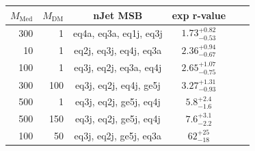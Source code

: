 \begin{table}
  \centering
  \begin{tabular}{rrcccc}
    \hline\hline
    $M_{\text{Med}}$ & $M_{\text{DM}}$ & nJet MSB & exp r-value\\
    \hline
      300 &   1 & eq4a, eq3a, eq1j, eq3j & $1.73_{-0.53}^{+0.82}$     \\ %
       10 &   1 & eq2j, eq3j, eq4j, eq3a & $2.36_{-0.67}^{+0.94}$     \\ %
      100 &   1 & eq3j, eq2j, eq3a, eq4j & $2.65_{-0.75}^{+1.07}$     \\ %
      300 & 100 & eq3j, eq2j, eq4j, ge5j & $3.27_{-0.93}^{+1.31}$     \\ %
      500 &   1 & eq3j, eq2j, ge5j, eq4j & $5.8_{-1.6}^{+2.4}$        \\ %
      500 & 150 & eq3j, eq2j, ge5j, eq4j & $7.6_{-2.2}^{+3.1}$        \\ %
      100 &  50 & eq3j, eq2j, ge5j, eq3a & $62_{-18}^{+25}$           \\ %

\end{tabular}
\end{table}
